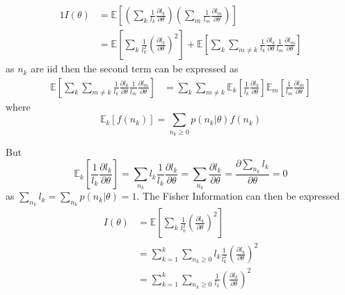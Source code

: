 \begin{alignat*}{1}
	I(\theta) & =\mathbb{E}\left[\left(\sum_{k}\frac{1}{l_{k}}\frac{\partial l_{k}}{\partial\theta}\right)\left(\sum_{m}\frac{1}{l_{m}}\frac{\partial l_{m}}{\partial\theta}\right)\right]\\
	 & =\mathbb{E}\left[\sum_{k}\frac{1}{l_{k}^{2}}\left(\frac{\partial l_{k}}{\partial\theta}\right)^{2}\right]+\mathbb{E}\left[\sum_{k}\sum_{m\neq k}\frac{1}{l_{k}}\frac{\partial l_{k}}{\partial\theta}\frac{1}{l_{m}}\frac{\partial l_{m}}{\partial\theta}\right]
\end{alignat*}
%
as $n_{k}$ are iid then the second term can be expressed as 
%
\begin{align*}
	\mathbb{E}\left[\sum_{k}\sum_{m\neq k}\frac{1}{l_{k}}\frac{\partial l_{k}}{\partial\theta}\frac{1}{l_{m}}\frac{\partial l_{m}}{\partial\theta}\right] & =\sum_{k}\sum_{m\neq k}\mathbb{E}_{k}\left[\frac{1}{l_{k}}\frac{\partial l_{k}}{\partial\theta}\right]\mathbb{E}_{m}\left[\frac{1}{l_{m}}\frac{\partial l_{m}}{\partial\theta}\right]
\end{align*}
%
where
%
\begin{equation}
	\mathbb{E}_{k}\left[f(n_{k})\right]=\sum_{n_{k}\geq0}p(n_{k}|\theta)f(n_{k})
\end{equation}

But 
%
\begin{equation}
	\mathbb{E}_{k}\left[\frac{1}{l_{k}}\frac{\partial l_{k}}{\partial\theta}\right]=\sum_{n_{k}}l_{k}\frac{1}{l_{k}}\frac{\partial l_{k}}{\partial\theta}=\sum_{n_{k}}\frac{\partial l_{k}}{\partial\theta}=\frac{\partial\sum_{n_{k}}l_{k}}{\partial\theta}=0
\end{equation}
%
as $\sum_{n_{k}}l_{k}=\sum_{n_{k}}p(n_{k}|\theta)=1$. The Fisher Information can then be expressed 
%
\begin{align*}
	I(\theta) & =\mathbb{E}\left[\sum_{k}\frac{1}{l_{k}^{2}}\left(\frac{\partial l_{k}}{\partial\theta}\right)^{2}\right]\\
	 & =\sum_{k=1}^{k}\sum_{n_{k}\geq0}l_{k}\frac{1}{l_{k}^{2}}\left(\frac{\partial l_{k}}{\partial\theta}\right)^{2}\\
	 & =\sum_{k=1}^{k}\sum_{n_{k}\geq0}\frac{1}{l_{k}}\left(\frac{\partial l_{k}}{\partial\theta}\right)^{2}
\end{align*}

